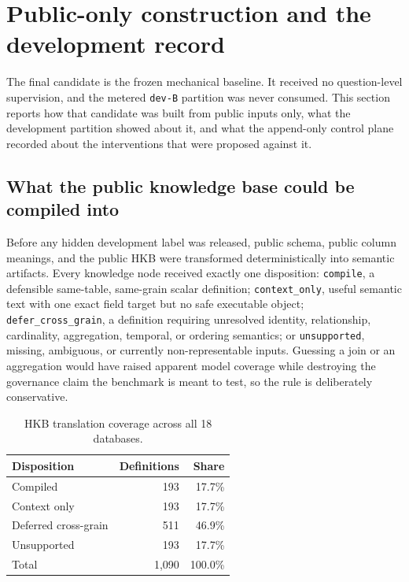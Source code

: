 \section{Public-only construction and the development record}
\label{sec:development}

The final candidate is the frozen mechanical baseline. It received no
question-level supervision, and the metered \texttt{dev-B} partition was never
consumed. This section reports how that candidate was built from public inputs
only, what the development partition showed about it, and what the append-only
control plane recorded about the interventions that were proposed against it.

\subsection{What the public knowledge base could be compiled into}

Before any hidden development label was released, public schema, public column
meanings, and the public HKB were transformed deterministically into semantic
artifacts. Every knowledge node received exactly one disposition:
\texttt{compile}, a defensible same-table, same-grain scalar definition;
\texttt{context\_only}, useful semantic text with one exact field target but no
safe executable object; \texttt{defer\_cross\_grain}, a definition requiring
unresolved identity, relationship, cardinality, aggregation, temporal, or
ordering semantics; or \texttt{unsupported}, missing, ambiguous, or currently
non-representable inputs. Guessing a join or an aggregation would have raised
apparent model coverage while destroying the governance claim the benchmark is
meant to test, so the rule is deliberately conservative.

\begin{table}[htbp]
\centering
\caption{HKB translation coverage across all 18 databases.}
\label{tab:hkbcoverage}
\begin{tabular}{lrr}
\toprule
Disposition & Definitions & Share \\
\midrule
Compiled & 193 & 17.7\% \\
Context only & 193 & 17.7\% \\
Deferred cross-grain & 511 & 46.9\% \\
Unsupported & 193 & 17.7\% \\
\midrule
Total & 1,090 & 100.0\% \\
\bottomrule
\end{tabular}
\end{table}

